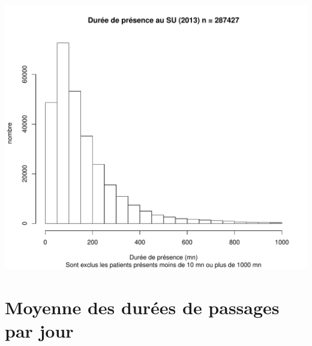 \documentclass[12pt,english,french,twoside]{book}\usepackage[]{graphicx}\usepackage[]{color}
\makeatletter
\def\maxwidth{ %
  \ifdim\Gin@nat@width>\linewidth
    \linewidth
  \else
    \Gin@nat@width
  \fi
}
\newenvironment{knitrout}{}{} %
\makeatother
\begin{document}
\begin{center}
\begin{knitrout}
\color{fgcolor}
\includegraphics[width=\maxwidth]{figure/passages_clean_hist} 

\end{knitrout}

\end{center}


\section{Moyenne des durées de passages par jour}
\end{document}
